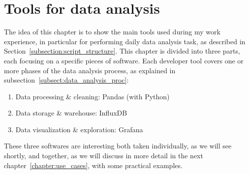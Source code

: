 \chapter{Tools for data analysis}
The idea of this chapter is to show the main tools used during my work experience, in particular for performing daily data analysis task, as described in Section~\ref{subsection:script_structure}.
This chapter is divided into three parts, each focusing on a specific pieces of software. Each developer tool covers one or more phases of the data analysis process, as explained in subsection~\ref{subsect:data_analysis_proc}:
\begin{enumerate}
    \item Data processing \& cleaning: Pandas (with Python)
    \item Data storage \& warehouse: InfluxDB
    \item Data visualization \& exploration: Grafana
\end{enumerate}
These three softwares are interesting both taken individually, as we will see shortly, and together, as we will discuss in more detail in the next chapter~\ref{chapter:use_cases}, with some practical examples.




